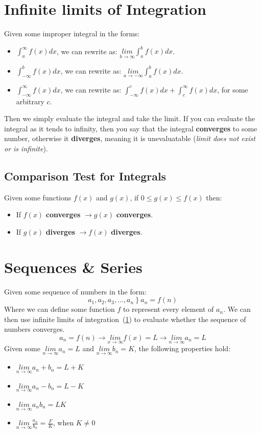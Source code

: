 \documentclass[a4paper]{article}
\begin{document}
  \section{Infinite limits of Integration} \label{sec:improper integrals}
  Given some improper integral in the forms:
  \begin{itemize}
    \item $\int^\infty_{a} f(x) dx$, we can rewrite as: $\underset{b\rightarrow \infty}{lim}\int^b_a f(x)dx$.
    \item $\int^b_{-\infty} f(x) dx$, we can rewrite as: $\underset{a\rightarrow -\infty}{lim}\int^b_a f(x)dx$.
    \item $\int^\infty_{-\infty} f(x) dx$, we can rewrite as: $\int^c_{-\infty} f(x) dx + \int^\infty_{c} f(x) dx$, for some arbitrary $c$.
  \end{itemize}
  Then we simply evaluate the integral and take the limit. If you can evaluate the integral as it tends to infinity, then you say that the integral \textbf{converges} to some number, otherwise it \textbf{diverges}, meaning it is unevaluatable (\textit{limit does not exist or is infinite}).
  \subsection{Comparison Test for Integrals}
  Given some functions $f(x)$ and $g(x)$, if $0 \le g(x) \le f(x)$ then:

  \begin{itemize}
    \item If $f(x)$ \textbf{converges} $\rightarrow g(x)$ \textbf{converges}.
    \item If $g(x)$ \textbf{diverges} $\rightarrow f(x)$ \textbf{diverges}.
  \end{itemize}

  \section{Sequences \& Series} 
  Given some sequence of numbers in the form:
  \[
    a_1,a_2,a_3,\dots,a_n\ \}\ a_n = f(n)
  \]
  Where we can define some function $f$ to represent every element of $a_n$. We can then use infinite limits of integration~(\ref{sec:improper integrals}) to evaluate whether the sequence of numbers converges. 
  \[
    a_n = f(n) \rightarrow \underset{x\rightarrow \infty}{lim} f(x) = L \rightarrow \underset{n\rightarrow \infty}{lim} a_n = L
  \]
  Given some $\underset{n\rightarrow \infty}{lim} a_n = L$ and $\underset{n\rightarrow \infty}{lim} b_n = K$, the following properties hold:
  \begin{itemize}
    \item $\underset{n\rightarrow \infty}{lim} a_n + b_n = L + K$
    \item $\underset{n\rightarrow \infty}{lim} a_n - b_n = L - K$
    \item $\underset{n\rightarrow \infty}{lim} a_n  b_n = L  K$
    \item $\underset{n\rightarrow \infty}{lim} \frac{a_n}{b_n } = \frac{F }{K}$, when $K \neq 0$
  \end{itemize}
\end{document}
